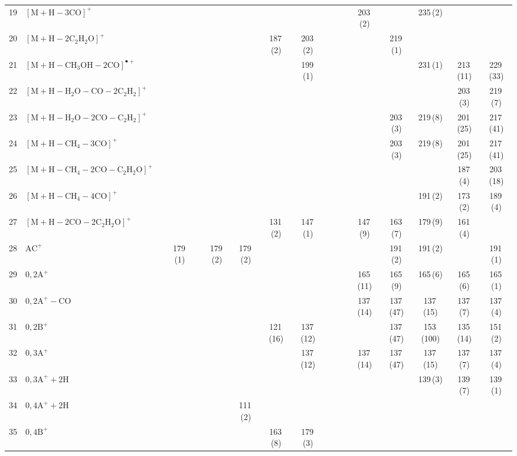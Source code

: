 \documentclass[]{article}
\begin{document}
\begin{table}
{\begin{tabular}{ll|ccccc|ccccc|ccccc}
  19 & $\mathrm{[M{+}H{-}3CO]^+}$ &  &  &  &  &  &  &  &  &  &  & 203\,(2) &  & 235\,(2) &  &  \\ 
  20 & $\mathrm{[M{+}H{-}2C_{2}H_{2}O]^+}$ &  &  &  &  &  & 187\,(2) & 203\,(2) &  &  &  &  & 219\,(1) &  &  &  \\ 
  21 & $\mathrm{[M{+}H{-}CH_{3}OH{-}2CO]^{\bullet+}}$ &  &  &  &  &  &  & 199\,(1) &  &  &  &  &  & 231\,(1) & 213\,(11) & 229\,(33) \\ 
  22 & $\mathrm{[M{+}H{-}H_{2}O{-}CO{-}2C_{2}H_{2}]^+}$ &  &  &  &  &  &  &  &  &  &  &  &  &  & 203\,(3) & 219\,(7) \\ 
  23 & $\mathrm{[M{+}H{-}H_{2}O{-}2CO{-}C_{2}H_{2}]^+}$ &  &  &  &  &  &  &  &  &  &  &  & 203\,(3) & 219\,(8) & 201\,(25) & 217\,(41) \\ 
  24 & $\mathrm{[M{+}H{-}CH_{4}{-}3CO]^+}$ &  &  &  &  &  &  &  &  &  &  &  & 203\,(3) & 219\,(8) & 201\,(25) & 217\,(41) \\ 
  25 & $\mathrm{[M{+}H{-}CH_{4}{-}2CO{-}C_{2}H_{2}O]^+}$ &  &  &  &  &  &  &  &  &  &  &  &  &  & 187\,(4) & 203\,(18) \\ 
  26 & $\mathrm{[M{+}H{-}CH_{4}{-}4CO]^+}$ &  &  &  &  &  &  &  &  &  &  &  &  & 191\,(2) & 173\,(2) & 189\,(4) \\ 
  27 & $\mathrm{[M{+}H{-}2CO{-}2C_{2}H_{2}O]^+}$ &  &  &  &  &  & 131\,(2) & 147\,(1) &  &  &  & 147\,(9) & 163\,(7) & 179\,(9) & 161\,(4) &  \\ 
  28 & $\mathrm{AC^+}$ &  & 179\,(1) &  & 179\,(2) & 179\,(2) &  &  &  &  &  &  & 191\,(2) & 191\,(2) &  & 191\,(1) \\ 
  29 & $\mathrm{0{,}2A^+}$ &  &  &  &  &  &  &  &  &  &  & 165\,(11) & 165\,(9) & 165\,(6) & 165\,(6) & 165\,(1) \\ 
  30 & $\mathrm{0{,}2A^+{-}CO}$ &  &  &  &  &  &  &  &  &  &  & 137\,(14) & 137\,(47) & 137\,(15) & 137\,(7) & 137\,(4) \\ 
  31 & $\mathrm{0{,}2B^+}$ &  &  &  &  &  & 121\,(16) & 137\,(12) &  &  &  &  & 137\,(47) & 153\,(100) & 135\,(14) & 151\,(2) \\ 
  32 & $\mathrm{0{,}3A^+}$ &  &  &  &  &  &  & 137\,(12) &  &  &  & 137\,(14) & 137\,(47) & 137\,(15) & 137\,(7) & 137\,(4) \\ 
  33 & $\mathrm{0{,}3A^+{+}2H}$ &  &  &  &  &  &  &  &  &  &  &  &  & 139\,(3) & 139\,(7) & 139\,(1) \\ 
  34 & $\mathrm{0{,}4A^+{+}2H}$ &  &  &  &  & 111\,(2) &  &  &  &  &  &  &  &  &  &  \\ 
  35 & $\mathrm{0{,}4B^+}$ &  &  &  &  &  & 163\,(8) & 179\,(3) &  &  &  &  &  &  &  &  \\ 

\end{tabular}}
\end{table}
\end{document}
